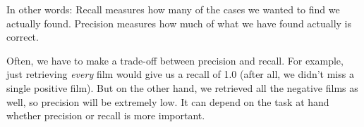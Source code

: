 In other words: Recall measures how many of the cases we wanted to find we actually found. Precision measures how much of what we have found actually is correct.

Often, we have to make a trade-off between precision and recall. For example, just retrieving \emph{every} film would give us a recall of 1.0 (after all, we didn't miss a single positive film). But on the other hand, we retrieved all the negative films as well, so precision will be extremely low. It can depend on the task at hand whether precision or recall is more important.


